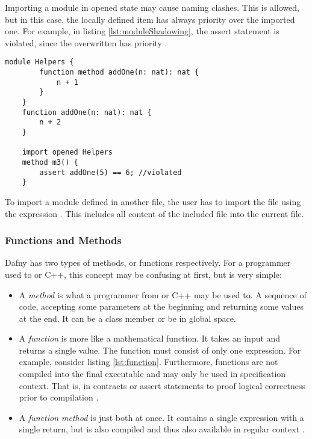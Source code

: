 Importing a module in opened state may cause naming clashes.
This is allowed, but in this case, the locally defined item has always priority over the imported one.
For example, in listing \ref{lst:moduleShadowing}, the assert statement is violated, since the overwritten  has priority \cite{functionVSMethod}.

\begin{lstlisting}[language = dafny, caption={Naming Clash}, captionpos=b, label={lst:moduleShadowing}]
    module Helpers {
        function method addOne(n: nat): nat {
            n + 1
        }
    }
    function addOne(n: nat): nat {
        n + 2
    }

    import opened Helpers
    method m3() {
        assert addOne(5) == 6; //violated
    }

\end{lstlisting}

To import a module defined in another file, the user has to import the file using the expression .
This includes all content of the included file into the current file.

\subsubsection{Functions and Methods}
Dafny has two types of methods, or functions respectively.
For a programmer used to \CsharpWithSpace or C++, this concept may be confusing at first, but is very simple:
\begin{itemize}
\item A \textit{method} is what a programmer from \CsharpWithSpace or C++ may be used to.
A sequence of code, accepting some parameters at the beginning and returning some values at the end.
It can be a class member or be in global space.
\item A \textit{function} is more like a mathematical function.
It takes an input and returns a single value.
The function must consist of only one expression.
For example, consider listing \ref{lst:function}.
Furthermore, functions are not compiled into the final executable and may only be used in specification context.
That is, in contracts or assert statements to proof logical correctness prior to compilation \cite{functionVSMethod}.
\item A \textit{function method} is just both at once.
It contains a single expression with a single return, but is also compiled and thus also available in regular context \cite{functionVSMethod}.
\end{itemize}

